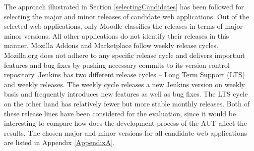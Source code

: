   \begin{table}
  \centering
  \caption{Overview of evaluation candidate web applications}
  \label{appcandidates}
  \end{table}

The approach illustrated in Section \ref{selectingCandidates} has been followed for selecting the major and minor releases of candidate web applications. Out of the selected web applications, only Moodle classifies the releases in terms of major-minor versions. All other applications do not identify their releases in this manner. Mozilla Addons and Marketplace follow weekly release cycles. Mozilla.org does not adhere to any specific release cycle and delivers important features and bug fixes by pushing necessary commits to its version control repository. Jenkins has two different release cycles -- Long Term Support (LTS) and weekly releases. The weekly cycle releases a new Jenkins version on weekly basis and frequently introduces new features as well as bug fixes. The LTS cycle on the other hand has relatively fewer but more stable monthly releases. Both of these release lines have been considered for the evaluation, since it would be interesting to compare how does the development process of the AUT affect the results. The chosen major and minor versions for all candidate web applications are listed in Appendix \ref{AppendixA}.

